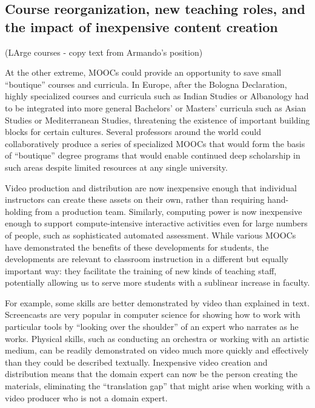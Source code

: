 \subsection{Course reorganization, new teaching roles,  and the impact of
  inexpensive content creation} 

(LArge courses - copy text from Armando's position)




At the other extreme, MOOCs could provide an opportunity to save small
``boutique'' courses and curricula.
In Europe, after the Bologna Declaration, highly specialized courses and
curricula such as Indian Studies or Albanology had to be integrated into
more general Bachelors' or Masters' curricula such as Asian Studies or
Mediterranean Studies, threatening the existence of important building
blocks for certain cultures.
Several professors around the world could collaboratively produce a
series of specialized MOOCs that would form the basis of ``boutique''
degree programs that would enable continued deep scholarship in such
areas despite limited resources at any single university.



Video production and distribution are now inexpensive enough that
individual instructors can create these assets on their own, rather than
requiring hand-holding from a production team. Similarly, computing
power is now inexpensive enough to support compute-intensive interactive
activities even for large numbers of people, such as sophisticated
automated assessment. While various MOOCs have demonstrated the benefits
of these developments for students, the developments are relevant to
classroom instruction in a different but equally important way: they
facilitate the training of new kinds of teaching staff, potentially
allowing us to serve more students with a sublinear increase in faculty.

For example, some skills are better demonstrated by video than explained
in text. Screencasts are very popular in computer science for showing
how to work with particular tools by ``looking over the shoulder'' of an
expert who narrates as he works. Physical skills, such as conducting an
orchestra or working with an artistic medium, can be readily
demonstrated on video much more quickly and effectively than they could
be described textually. Inexpensive video creation and distribution
means that the domain expert can now be the person creating the
materials, eliminating the ``translation gap'' that might arise when
working with a video producer who is not a domain expert.

